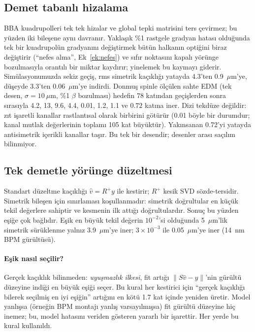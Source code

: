 \documentclass[11pt,a4paper]{article}
\begin{document}
\subsection{Demet tabanlı hizalama}
BBA kuadrupolleri tek tek hizalar ve global tepki matrisini ters çevirmez; bu yüzden iki bileşene aynı
davranır. Yaklaşık \%1 rastgele gradyan hatası olduğunda tek bir kuadrupolün gradyanını değiştirmek bütün
halkanın optiğini biraz değiştirir (``nefes alma'', Ek~\ref{ek:nefes}) ve sıfır noktasını kapalı yörünge
bozulmasıyla orantılı bir miktar kaydırır; yinelemek bu kaymayı giderir. Simülasyonumuzda sekiz geçiş, rms
simetrik kaçıklığı yatayda 4.3'ten 0.9~$\mu$m'ye, düşeyde 3.3'ten 0.06~$\mu$m'ye indirdi. Donmuş spinle
ölçülen sahte EDM (tek desen, $\sigma=10~\mu$m, \%1 $\beta$ bozulması) hedefin $78$ katından geçişlerden sonra
sırasıyla 4.2, 13, 9.6, 4.4, 0.01, 1.2, 1.1 ve $0.72$ katına iner. Dizi tekdüze değildir: zıt işaretli kanallar
rastlantısal olarak birbirini götürür (0.01 böyle bir durumdur; kanal mutlak değerlerinin toplamı 105 kat
büyüktür). Yakınsanan 0.72'yi yatayda antisimetrik içerikli kanallar taşır. Bu tek bir desendir; desenler
arası saçılım bilinmiyor.

\subsection{Tek demetle yörünge düzeltmesi}\label{sec:tekdemet}
Standart düzeltme kaçıklığı $\hat v=R^+y$ ile kestirir; $R^+$ kesik SVD sözde-tersidir. Simetrik bileşen için
sınırlaması koşullanmadır: simetrik doğrultular en küçük tekil değerlere sahiptir ve kesmenin ilk attığı
doğrultulardır. Sonuç bu yüzden eşiğe çok bağlıdır. Eşik en büyük tekil değerin $10^{-2}$'si olduğunda
5~$\mu$m'lik simetrik sürüklenme yalnız 3.9~$\mu$m'ye iner; $3\times10^{-3}$ ile 0.05~$\mu$m'ye iner (14~nm BPM
gürültüsü).

\paragraph{Eşik nasıl seçilir?} Gerçek kaçıklık bilinmeden: \emph{uyuşmazlık ilkesi}, fit artığı
$\|S\hat v-y\|$'nin gürültü düzeyine indiği en büyük eşiği seçer. Bu kural her kestirici için ``gerçek
kaçıklığı bilerek seçilmiş en iyi eşiğin'' artığını en kötü 1.7 kat içinde yeniden üretir. Model yanlışsa
(örneğin BPM montajı yanlış varsayılmışsa) fit gürültü düzeyine hiç inemez; bu, model hatasını veriden
gösteren yararlı bir işarettir. Her yerde bu kural kullanıldı.
\end{document}
